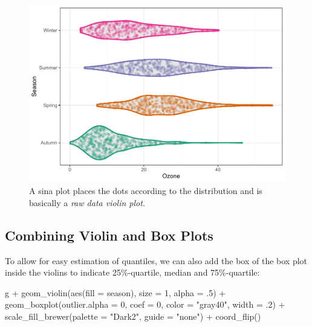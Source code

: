 \documentclass[
]{krantz}
\makeatletter
\newenvironment{Shaded}{\begin{snugshade}}{\end{snugshade}}
\newcommand{\AttributeTok}[1]{\textcolor[rgb]{0.61,0.61,0.61}{#1}}
\newcommand{\DecValTok}[1]{\textcolor[rgb]{0.06,0.06,0.06}{#1}}
\newcommand{\FunctionTok}[1]{\textcolor[rgb]{0,0,0}{#1}}
\newcommand{\NormalTok}[1]{#1}
\newcommand{\SpecialCharTok}[1]{\textcolor[rgb]{0,0,0}{#1}}
\newcommand{\StringTok}[1]{\textcolor[rgb]{0.5,0.5,0.5}{#1}}
\newenvironment{kframe}{%
\medskip{}
\setlength{\fboxsep}{.8em}
 \def\at@end@of@kframe{}%
 \ifinner\ifhmode%
  \def\at@end@of@kframe{\end{minipage}}%
  \begin{minipage}{\columnwidth}%
 \fi\fi%
 \def\FrameCommand##1{\hskip\@totalleftmargin \hskip-\fboxsep
 \colorbox{shadecolor}{##1}\hskip-\fboxsep
     \hskip-\linewidth \hskip-\@totalleftmargin \hskip\columnwidth}%
 \MakeFramed {\advance\hsize-\width
   \@totalleftmargin\z@ \linewidth\hsize
   \@setminipage}}%
 {\par\unskip\endMakeFramed%
 \at@end@of@kframe}
\renewenvironment{Shaded}{\begin{kframe}}{\end{kframe}}
\makeatother
\begin{document}
\begin{figure}
\centering
\includegraphics{bookdown_files/figure-latex/violin-sina-1.pdf}
\caption{\label{fig:violin-sina}A sina plot places the dots according to the distribution and is basically a \emph{raw data violin plot}.}
\end{figure}

\hypertarget{combining-violin-and-box-plots}{%
\subsection{Combining Violin and Box Plots}\label{combining-violin-and-box-plots}}

To allow for easy estimation of quantiles, we can also add the box of the box plot inside the violins to indicate 25\%-quartile, median and 75\%-quartile:

\begin{Shaded}
\begin{Highlighting}[]
\NormalTok{g }\SpecialCharTok{+} \FunctionTok{geom\_violin}\NormalTok{(}\FunctionTok{aes}\NormalTok{(}\AttributeTok{fill =}\NormalTok{ season), }\AttributeTok{size =} \DecValTok{1}\NormalTok{, }\AttributeTok{alpha =}\NormalTok{ .}\DecValTok{5}\NormalTok{) }\SpecialCharTok{+}
    \FunctionTok{geom\_boxplot}\NormalTok{(}\AttributeTok{outlier.alpha =} \DecValTok{0}\NormalTok{, }\AttributeTok{coef =} \DecValTok{0}\NormalTok{,}
                 \AttributeTok{color =} \StringTok{"gray40"}\NormalTok{, }\AttributeTok{width =}\NormalTok{ .}\DecValTok{2}\NormalTok{) }\SpecialCharTok{+}
    \FunctionTok{scale\_fill\_brewer}\NormalTok{(}\AttributeTok{palette =} \StringTok{"Dark2"}\NormalTok{, }\AttributeTok{guide =} \StringTok{"none"}\NormalTok{) }\SpecialCharTok{+}
    \FunctionTok{coord\_flip}\NormalTok{()}
\end{Highlighting}
\end{Shaded}
\end{document}
